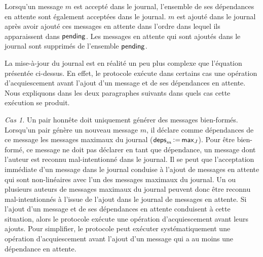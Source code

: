 Lorsqu'un message $m$ est accepté dans le journal, l'ensemble de ses dépendances en attente sont également acceptées dans le journal.
$m$ est ajouté dans le journal après avoir ajouté ces messages en attente dans l'ordre dans lequel ils apparaissent dans $\operatorname{\mathsf{pending}}$.
Les messages en attente qui sont ajoutés dans le journal sont supprimés de l'ensemble $\operatorname{\mathsf{pending}}$.



La mise-à-jour du journal est en réalité un peu plus complexe que l'équation présentée ci-dessus.
En effet, le protocole exécute dans certains cas une opération d'acquiescement avant l'ajout d'un message et de ses dépendances en attente.
Nous expliquons dans les deux paragraphes suivants dans quels cas cette exécution se produit.

\emph{Cas 1.} Un pair honnête doit uniquement générer des messages bien-formés.
Lorsqu'un pair génère un nouveau message $m$, il déclare comme dépendances de ce message les messages maximaux du journal ($\operatorname{\mathsf{deps}}_m \operatorname{\vcentcolon=} \operatorname{\mathsf{max}}_J$).
Pour être bien-formé, ce message ne doit pas déclarer en tant que dépendance, un message dont l'auteur est reconnu mal-intentionné dans le journal.
Il se peut que l'acceptation immédiate d'un message dans le journal conduise à l'ajout de messages en attente qui sont non-linéaires avec l'un des messages maximaux du journal.
Un ou plusieurs auteurs de messages maximaux du journal peuvent donc être reconnu mal-intentionnés à l'issue de l'ajout dans le journal de messages en attente.
Si l'ajout d'un message et de ses dépendances en attente conduisent à cette situation, alors le protocole exécute une opération d'acquiescement avant leurs ajouts.
Pour simplifier, le protocole peut exécuter systématiquement une opération d'acquiescement avant l'ajout d'un message qui a au moins une dépendance en attente.


